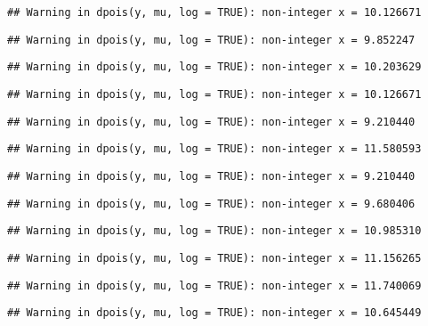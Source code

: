 \documentclass[
]{article}
\begin{document}
\begin{verbatim}
## Warning in dpois(y, mu, log = TRUE): non-integer x = 10.126671
\end{verbatim}

\begin{verbatim}
## Warning in dpois(y, mu, log = TRUE): non-integer x = 9.852247
\end{verbatim}

\begin{verbatim}
## Warning in dpois(y, mu, log = TRUE): non-integer x = 10.203629
\end{verbatim}

\begin{verbatim}
## Warning in dpois(y, mu, log = TRUE): non-integer x = 10.126671
\end{verbatim}

\begin{verbatim}
## Warning in dpois(y, mu, log = TRUE): non-integer x = 9.210440
\end{verbatim}

\begin{verbatim}
## Warning in dpois(y, mu, log = TRUE): non-integer x = 11.580593
\end{verbatim}

\begin{verbatim}
## Warning in dpois(y, mu, log = TRUE): non-integer x = 9.210440
\end{verbatim}

\begin{verbatim}
## Warning in dpois(y, mu, log = TRUE): non-integer x = 9.680406
\end{verbatim}

\begin{verbatim}
## Warning in dpois(y, mu, log = TRUE): non-integer x = 10.985310
\end{verbatim}

\begin{verbatim}
## Warning in dpois(y, mu, log = TRUE): non-integer x = 11.156265
\end{verbatim}

\begin{verbatim}
## Warning in dpois(y, mu, log = TRUE): non-integer x = 11.740069
\end{verbatim}

\begin{verbatim}
## Warning in dpois(y, mu, log = TRUE): non-integer x = 10.645449
\end{verbatim}
\end{document}
